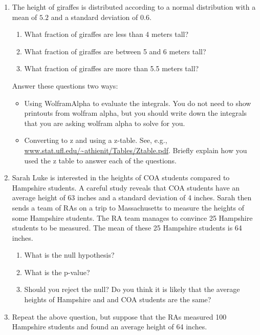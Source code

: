 \documentclass[12pt]{article}
\begin{document}
\begin{enumerate}
\setlength{\itemsep}{-1mm}
\item The height of giraffes is distributed according to a normal
  distribution with a mean of $5.2$ and a standard deviation of
  $0.6$.  
\begin{enumerate}
\setlength{\itemsep}{-1mm}
\item What fraction of giraffes are less than 4 meters tall?
\item What fraction of giraffes are between 5 and 6 meters tall?
\item What fraction of giraffes are more than 5.5 meters tall?
\end{enumerate}
Answer these questions two ways:
\begin{itemize}
\setlength{\itemsep}{-1mm}
\item Using WolframAlpha to evaluate the integrals.  You do not need
  to show printouts from wolfram alpha, but you should write down the
  integrals that you are asking wolfram alpha to solve for you.
\item Converting to z and using a z-table. See, e.g.,
  \url{www.stat.ufl.edu/~athienit/Tables/Ztable.pdf}.  Briefly explain
  how you used the z table to answer each of the questions. 
\end{itemize}

\item Sarah Luke is interested in the heights of COA students compared
  to Hampshire students.  A careful study reveals that COA students
  have an average height of 63 inches and a standard deviation of 4
  inches.  Sarah then sends a team of RAs on a trip to Massachusetts
  to measure the heights of some Hampshire students.  The RA team
  manages to convince 25 Hampshire students to be measured.  The mean
  of these 25 Hampshire students is 64 inches. 
\begin{enumerate}
\setlength{\itemsep}{-1mm}
  \item What is the null hypothesis?
  \item What is the p-value?
  \item Should you reject the null?  Do you think it is likely that
    the average heights of Hampshire and and COA students are the
    same? 
\end{enumerate}

\item Repeat the above question, but suppose that the RAs measured 100
  Hampshire students and found an average height of 64 inches.  

\end{enumerate}
\end{document}
